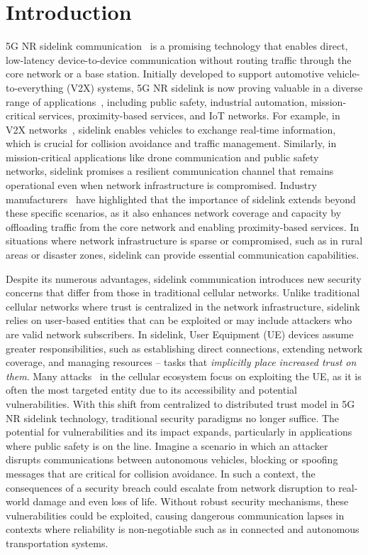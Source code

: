 \section{Introduction}

5G NR sidelink communication~\cite{bell-labs, 3gpp.23.287, 3gpp.37.985, 3gpp.33.536, 3gpp.24.587, weerackody23:whoneeds} is a promising technology that enables direct, low-latency device-to-device communication without routing traffic through the core network or a base station. Initially developed to support automotive vehicle-to-everything (V2X) systems, 5G NR sidelink is now proving valuable in a diverse range of applications~\cite{qualcomm2}, including public safety, industrial automation, mission-critical services, proximity-based services, and IoT networks. For example, in V2X networks~\cite{qualcomm3}, sidelink enables vehicles to exchange real-time information, which is crucial for collision avoidance and traffic management. Similarly, in mission-critical applications like drone communication and public safety networks, sidelink promises a resilient communication channel that remains operational even when network infrastructure is compromised. Industry manufacturers~\cite{qualcomm, qualcomm2, bell-labs} have highlighted that the importance of sidelink extends beyond these specific scenarios, as it also enhances network coverage and capacity by offloading traffic from the core network and enabling proximity-based services. In situations where network infrastructure is sparse or compromised, such as in rural areas or disaster zones, sidelink can provide essential communication capabilities.

Despite its numerous advantages, sidelink communication introduces new security concerns that differ from those in traditional cellular networks. Unlike traditional cellular networks where trust is centralized in the network infrastructure, sidelink relies on user-based entities that can be exploited or may include attackers who are valid network subscribers. In sidelink, User Equipment (UE) devices assume greater responsibilities, such as establishing direct connections, extending network coverage, and managing resources -- tasks that \textit{implicitly place increased trust on them}. Many attacks~\cite{Rupprecht18:sok, eleftherakis24:sok} in the cellular ecosystem focus on exploiting the UE, as it is often the most targeted entity due to its accessibility and potential vulnerabilities. With this shift from centralized to distributed trust model in 5G NR sidelink technology, traditional security paradigms no longer suffice. The potential for vulnerabilities and its impact expands, particularly in applications where public safety is on the line. Imagine a scenario in which an attacker disrupts communications between autonomous vehicles, blocking or spoofing messages that are critical for collision avoidance. In such a context, the consequences of a security breach could escalate from network disruption to real-world damage and even loss of life. Without robust security mechanisms, these vulnerabilities could be exploited, causing dangerous communication lapses in contexts where reliability is non-negotiable such as in connected and autonomous transportation systems.

